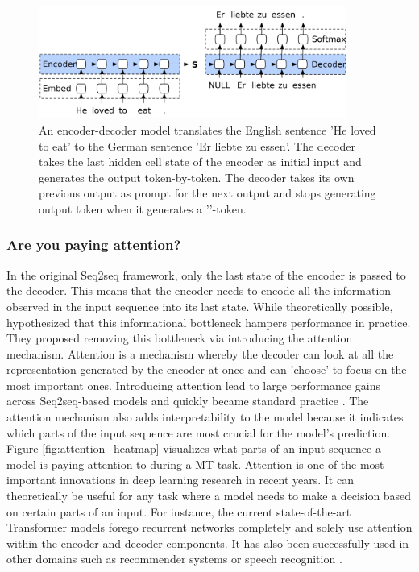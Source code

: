 \begin{figure}
	\centering\includegraphics[width=0.9\textwidth]{../visualizations/ch4-methods/enc_dec.pdf} 
	\caption{An encoder-decoder model \cite{ruderencdecgraphic} translates the English sentence 'He loved to eat' to the German sentence 'Er liebte zu essen'. The decoder takes the last hidden cell state of the encoder as initial input and generates the output token-by-token. The decoder takes its own previous output as prompt for the next output and stops generating output token when it generates a '.'-token. }
	\label{fig:encdec}
\end{figure}

\subsubsection{Are you paying attention?}
In the original Seq2seq framework, only the last state of the encoder is passed to the decoder. This means that the encoder needs to encode all the information observed in the input sequence into its last state. While theoretically possible, \cite{attention} hypothesized that this informational bottleneck hampers performance in practice. They proposed removing this bottleneck via introducing the attention mechanism. Attention is a mechanism whereby the decoder can look at all the representation generated by the encoder at once and can 'choose' to focus on the most important ones. Introducing attention lead to large performance gains across Seq2seq-based models and quickly became standard practice \cite{attentionforms}. 
The attention mechanism also adds interpretability to the model because it indicates which parts of the input sequence are most crucial for the model's prediction. Figure \ref{fig:attention_heatmap} visualizes what parts of an input sequence a model is paying attention to during a MT task. Attention is one of the most important innovations in deep learning research in recent years. It can theoretically be useful for any task where a model needs to make a decision based on certain parts of an input. For instance, the current state-of-the-art Transformer models \cite{allyouneed} \cite{bert} \cite{gpt3} forego recurrent networks completely and solely use attention within the encoder and decoder components. It has also been successfully used in other domains such as recommender systems \cite{attention_recommender_systems} or speech recognition \cite{attention_speech_recognition}. 
 

